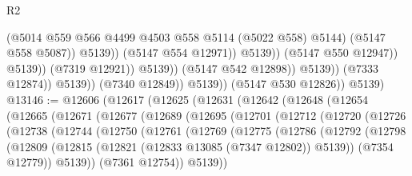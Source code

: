 \begin{lexlean}{R2}
\begin{coremodule}
                                                  (@5014
                                                    @559
                                                    @566
                                                    @4499
                                                    @4503
                                                    @558
                                                    @5114
                                                    (@5022 @558)
                                                    @5144)
                                                  (@5147 @558 @5087))
                                                @5139))
                                            (@5147 @554 @12971))
                                          @5139))
                                      (@5147 @550 @12947))
                                    @5139))
                                (@7319 @12921))
                              @5139))
                          (@5147 @542 @12898))
                        @5139))
                    (@7333 @12874))
                  @5139))
              (@7340 @12849))
            @5139))
        (@5147 @530 @12826))
      @5139)
@13146 := @12606
    (@12617
      (@12625
        (@12631
          (@12642
            (@12648
              (@12654
                (@12665
                  (@12671
                    (@12677
                      (@12689
                        (@12695
                          (@12701
                            (@12712
                              (@12720
                                (@12726
                                  (@12738
                                    (@12744
                                      (@12750
                                        (@12761
                                          (@12769
                                            (@12775
                                              (@12786
                                                (@12792
                                                  (@12798
                                                    (@12809
                                                      (@12815
                                                        (@12821
                                                          (@12833 @13085 (@7347 @12802))
                                                          @5139))
                                                      (@7354 @12779))
                                                    @5139))
                                                (@7361 @12754))
                                              @5139))

\end{coremodule}
\end{lexlean}
